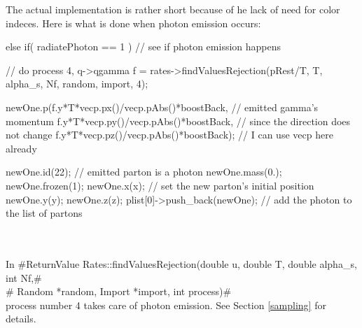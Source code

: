 The actual implementation is rather short because of he lack of need for color
indeces. Here is what is done when photon emission occurs:\\

\begin{boxedverbatim}
  else if( radiatePhoton == 1 ) // see if photon emission happens
  {
      // do process 4, q->qgamma
      f = rates->findValuesRejection(pRest/T, T, alpha_s, Nf, random, import, 4); 

      newOne.p(f.y*T*vecp.px()/vecp.pAbs()*boostBack,  // emitted gamma's momentum
      f.y*T*vecp.py()/vecp.pAbs()*boostBack,    // since the direction does not change 
      f.y*T*vecp.pz()/vecp.pAbs()*boostBack);   // I can use vecp here already

      newOne.id(22);                            // emitted parton is a photon
      newOne.mass(0.);
      newOne.frozen(1);
      newOne.x(x);                              // set the new parton's initial position
      newOne.y(y);
      newOne.z(z);
      plist[0]->push_back(newOne);              // add the photon to the list of partons 
  }
\end{boxedverbatim}\\

~\\
In 
#ReturnValue Rates::findValuesRejection(double u, double T, double alpha_s, int Nf,#\\
#                                         Random *random, Import *import, int process)#\\
process number 4 takes care of photon emission. See Section \ref{sampling} for details.


  
  

